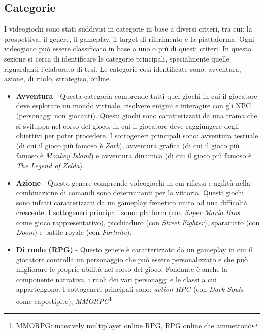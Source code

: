     \subsection{Categorie}\label{subsec:VideogiochiCategorie}
        I videogiochi sono stati suddivisi in categorie in base a diversi criteri, tra cui: la prospettiva, il genere, il gameplay, il target di riferimento e la piattaforma.
        Ogni videogioco può essere classificato in base a uno o più di questi criteri. In questa sezione si cerca di identificare le categorie principali, specialmente quelle riguardanti
        l'elaborato di tesi. Le categorie così identificate sono: avventura, azione, di ruolo, strategico, online.
        \begin{itemize}
            \item \textbf{Avventura} - Questa categoria comprende tutti quei giochi in cui il giocatore deve esplorare un mondo virtuale, risolvere enigmi e interagire con gli NPC 
                (personaggi non giocanti). Questi giochi sono caratterizzati da una trama che si sviluppa nel corso del gioco, in cui il giocatore deve raggiungere degli obiettivi per 
                poter procedere. I sottogeneri principali sono: avventura testuale (di cui il gioco più famoso è \textit{Zork}), avventura grafica (di cui il gioco più famoso è
                \textit{Monkey Island}) e avventura dinamica (di cui il gioco più famoso è \textit{The Legend of Zelda}).
            \item \textbf{Azione} - Questo genere comprende videogiochi in cui riflessi e agilità nella combinazione di comandi sono determinanti per la vittoria. Questi giochi sono 
                infatti caratterizzati da un gameplay frenetico unito ad una difficoltà crescente. I sottogeneri principali sono: platform (con \textit{Super Mario Bros.} 
                come gioco rappresentativo), picchiaduro (con \textit{Street Fighter}), sparatutto (con \textit{Doom}) e battle royale (con \textit{Fortnite}).
            \item \textbf{Di ruolo (RPG)} - Questo genere è caratterizzato da un gameplay in cui il giocatore controlla un personaggio che può essere personalizzato e che può 
                migliorare le proprie abilità nel corso del gioco. Fondante è anche la componente narrativa, i ruoli dei vari personaggi e le classi a cui appartengono. I sottogeneri
                principali sono: \textit{action RPG} (con \textit{Dark Souls} come capostipite), \textit{MMORPG}\footnote{MMORPG: massively multiplayer online RPG, RPG online che ammettono
}
\end{itemize}
